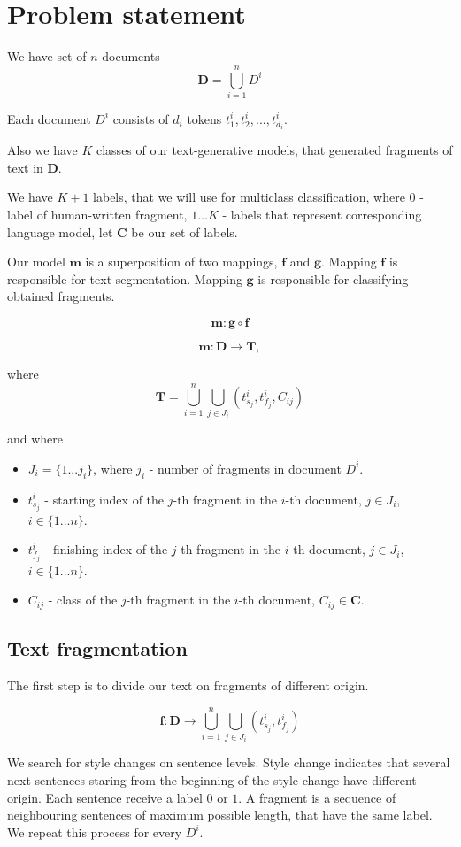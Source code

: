 \documentclass{article}
\begin{document}
\section{Problem statement}
We have set of $n$ documents
$$\mathbf{D} = \bigcup_{i=1}^{n}D^i$$

Each document  $D^i$ consists of $d_i$ tokens $t_1^i, t_2^i, ..., t_{d_i}^i$.

Also we have $K$ classes of our text-generative models, that generated fragments of text in $\mathbf{D}$.

We have $K + 1$ labels, that we will use for multiclass classification, where $0$ - label of human-written fragment, ${1...K}$ - labels that represent corresponding language model, let $\mathbf{C}$ be our set of labels.

Our model $\mathbf{m}$ is a superposition of two mappings, $\mathbf{f}$ and $\mathbf{g}$. Mapping $\mathbf{f}$ is responsible for text segmentation. Mapping $\mathbf{g}$ is responsible for classifying obtained fragments.

$$\mathbf{m} : \mathbf{g} \circ \mathbf{f}$$


$$\mathbf{m}: \mathbf{D} \rightarrow \mathbf{T},$$

where $$\mathbf{T} = \bigcup_{i=1}^{n}\bigcup_{j \in J_i}(t_{s_j}^i, t_{f_j}^i, C_{ij})$$

and where 
\begin{itemize}
    \item $J_i = \{1 ... j_i\}$, where $j_i$ - number of fragments in document $D^i$.
    \item $t_{s_j}^i$ - starting index of the $j$-th fragment in the $i$-th document, $j \in J_i$, $i \in \{1 ... n\}$.
    \item $t_{f_j}^i$ - finishing index of the $j$-th fragment in the $i$-th document, $j \in J_i$, $i \in \{1 ... n\}$.
    \item $C_{ij}$ - class of the $j$-th fragment in the $i$-th document, $C_{ij} \in \mathbf{C}$.
\end{itemize}

\subsection{Text fragmentation}
The first step is to divide our text on fragments of different origin.

$$\mathbf{f}: \mathbf{D} \rightarrow \bigcup_{i=1}^{n}\bigcup_{j \in J_i}(t_{s_j}^i, t_{f_j}^i)$$

We search for style changes on sentence levels. Style change indicates that several next sentences staring from the beginning of the style change have different origin. Each sentence receive a label $0$ or $1$. A fragment is a sequence of neighbouring sentences of maximum possible length, that have the same label. We repeat this process for every $D^i$.
\end{document}
